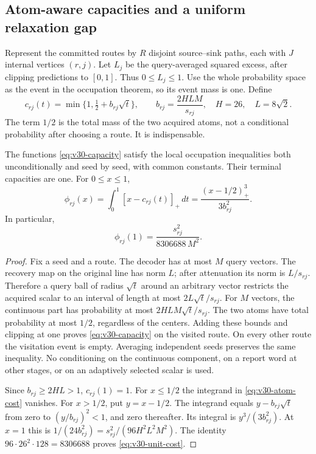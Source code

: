 \subsection{Atom-aware capacities and a uniform relaxation gap}
Represent the committed routes by $R$ disjoint source--sink paths, each
with $J$ internal vertices $(r,j)$. Let $L_j$ be the query-averaged
squared excess, after clipping predictions to $[0,1]$. Thus $0\le L_j\le1$.
Use the whole probability space as the event in the occupation theorem,
so its event mass is one. Define
\begin{equation}\label{eq:v30-capacity}
 c_{rj}(t)=\min\{1,\tfrac12+b_{rj}\sqrt t\},\qquad
 b_{rj}=\frac{2HLM}{s_{rj}},\quad H=26,\quad L=8\sqrt2.
\end{equation}
The term $1/2$ is the total mass of the two acquired atoms, not a
conditional probability after choosing a route. It is indispensable.

\begin{lemma}
\label{lem:v30-atom-capacity}
The functions \eqref{eq:v30-capacity} satisfy the local occupation
inequalities both unconditionally and seed by seed, with common
constants. Their terminal capacities are one. For $0\le x\le1$,
\begin{equation}\label{eq:v30-atom-cost}
 \phi_{rj}(x)=\int_0^1[x-c_{rj}(t)]_+\,dt
            =\frac{(x-1/2)_+^3}{3b_{rj}^2}.
\end{equation}
In particular,
\begin{equation}\label{eq:v30-unit-cost}
                 \phi_{rj}(1)
                      =\frac{s_{rj}^2}{8306688\,M^2}.
\end{equation}
\end{lemma}
\begin{proof}
Fix a seed and a route. The decoder has at most $M$ query vectors.
The recovery map on the original line has norm $L$; after attenuation
its norm is $L/s_{rj}$. Therefore a query ball of radius $\sqrt t$
around an arbitrary vector restricts the acquired scalar to an interval
of length at most $2L\sqrt t/s_{rj}$. For $M$ vectors, the continuous
part has probability at most $2HLM\sqrt t/s_{rj}$. The two atoms have
total probability at most $1/2$, regardless of the centers. Adding
these bounds and clipping at one proves \eqref{eq:v30-capacity} on
the visited route. On every other route the visitation event is empty.
Averaging independent seeds preserves the same inequality. No
conditioning on the continuous component, on a report word at other
stages, or on an adaptively selected scalar is used.

Since $b_{rj}\ge 2HL>1$, $c_{rj}(1)=1$. For $x\le1/2$ the
integrand in \eqref{eq:v30-atom-cost} vanishes. For $x>1/2$, put
$y=x-1/2$. The integrand equals $y-b_{rj}\sqrt t$ from zero to
$(y/b_{rj})^2<1$, and zero thereafter. Its integral is
$y^3/(3b_{rj}^2)$. At $x=1$ this is
$1/(24b_{rj}^2)=s_{rj}^2/(96H^2L^2M^2)$.
The identity $96\cdot26^2\cdot128=8306688$ proves
\eqref{eq:v30-unit-cost}.
\end{proof}


